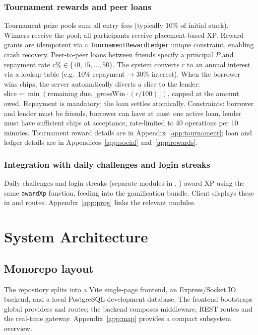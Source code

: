 \documentclass[11pt,a4paper]{article}
\begin{document}
\subsubsection{Tournament rewards and peer loans}

Tournament prize pools sum all entry fees (typically 10\% of initial stack). Winners receive the pool; all participants receive placement-based XP. Reward grants are idempotent via a \texttt{TournamentRewardLedger} unique constraint, enabling crash recovery. Peer-to-peer loans between friends specify a principal $P$ and repayment rate $r\% \in \{10, 15, \ldots, 50\}$. The system converts $r$ to an annual interest via a lookup table (e.g.\ 10\% repayment → 30\% interest). When the borrower wins chips, the server automatically diverts a slice to the lender: $\text{slice} = \min(\text{remaining due}, \lfloor \text{grossWin} \cdot (r/100) \rfloor)$, capped at the amount owed. Repayment is mandatory; the loan settles atomically. Constraints: borrower and lender must be friends, borrower can have at most one active loan, lender must have sufficient chips at acceptance, rate-limited to 40 operations per 10 minutes. Tournament reward details are in Appendix~\ref{app:tournament}; loan and ledger details are in Appendices~\ref{app:social} and~\ref{app:rewards}.

\subsubsection{Integration with daily challenges and login streaks}

Daily challenges and login streaks (separate modules in , ) award XP using the same \texttt{awardXp} function, feeding into the gamification bundle. Client displays these in  and  routes. Appendix~\ref{app:prog} links the relevant modules.

\section{System Architecture}
\label{sec:architecture}

\subsection{Monorepo layout}

The repository splits into a Vite single-page frontend, an Express/Socket.IO backend, and a local PostgreSQL development database. The frontend bootstraps global providers and routes; the backend composes middleware, REST routes and the real-time gateway. Appendix~\ref{app:map} provides a compact subsystem overview.
\end{document}
